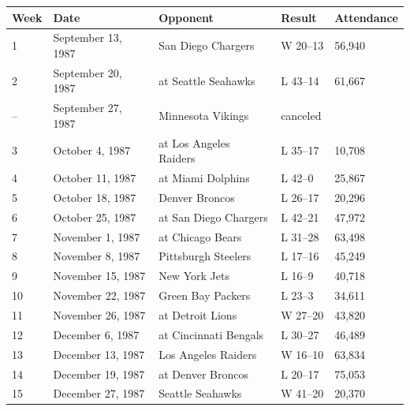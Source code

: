 \documentclass{article}
\begin{document}
\begin{tabular}{lllll}
\toprule
Week & Date & Opponent & Result & Attendance \\
\midrule
1 & September 13, 1987 & San Diego Chargers & W 20–13 & 56,940 \\
2 & September 20, 1987 & at Seattle Seahawks & L 43–14 & 61,667 \\
– & September 27, 1987 & Minnesota Vikings & canceled &  \\
3 & October 4, 1987 & at Los Angeles Raiders & L 35–17 & 10,708 \\
4 & October 11, 1987 & at Miami Dolphins & L 42–0 & 25,867 \\
5 & October 18, 1987 & Denver Broncos & L 26–17 & 20,296 \\
6 & October 25, 1987 & at San Diego Chargers & L 42–21 & 47,972 \\
7 & November 1, 1987 & at Chicago Bears & L 31–28 & 63,498 \\
8 & November 8, 1987 & Pittsburgh Steelers & L 17–16 & 45,249 \\
9 & November 15, 1987 & New York Jets & L 16–9 & 40,718 \\
10 & November 22, 1987 & Green Bay Packers & L 23–3 & 34,611 \\
11 & November 26, 1987 & at Detroit Lions & W 27–20 & 43,820 \\
12 & December 6, 1987 & at Cincinnati Bengals & L 30–27 & 46,489 \\
13 & December 13, 1987 & Los Angeles Raiders & W 16–10 & 63,834 \\
14 & December 19, 1987 & at Denver Broncos & L 20–17 & 75,053 \\
15 & December 27, 1987 & Seattle Seahawks & W 41–20 & 20,370 \\
\bottomrule
\end{tabular}
\end{document}
